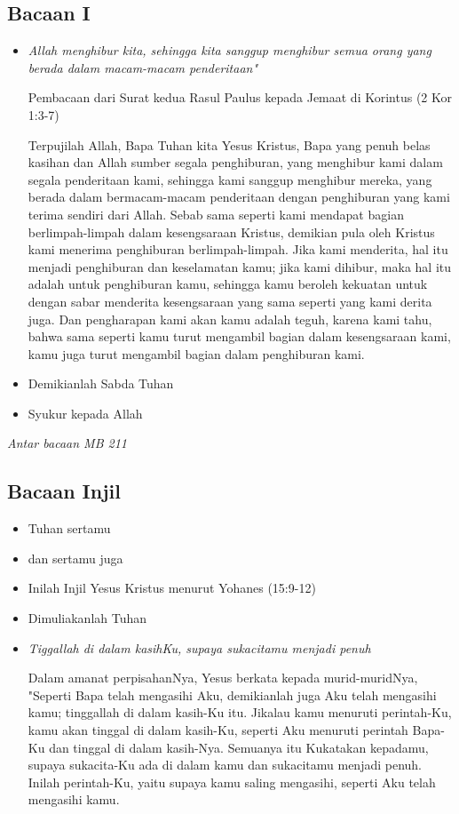 \documentclass[10pt,landscape]{article}
\makeatletter
\newcommand{\lagu}[1]{%
  {\parindent \z@ 
    \interlinepenalty\@M \slshape \mdseries \large \textit{#1}\par\nobreak \vskip 10\p@ }}
\newcommand{\BU}[1]{\begin{itemize} \item[U:] #1 \end{itemize}}
\newcommand{\BI}[1]{\begin{itemize} \item[I:] #1 \end{itemize}}
\newcommand{\BP}[1]{\begin{itemize} \item[P:] #1 \end{itemize}}
\makeatother
\begin{document}
\begin{multicols}{3}
\subsection*{Bacaan I}

\BP{\emph{Allah menghibur kita, sehingga kita sanggup menghibur semua orang yang berada dalam macam-macam penderitaan"}

Pembacaan dari Surat kedua Rasul Paulus kepada Jemaat di Korintus (2 Kor 1:3-7)

Terpujilah Allah, Bapa Tuhan kita Yesus Kristus, Bapa yang penuh belas kasihan dan Allah sumber segala penghiburan,
yang menghibur kami dalam segala penderitaan kami, sehingga kami sanggup menghibur mereka, yang berada dalam bermacam-macam penderitaan dengan penghiburan yang kami terima sendiri dari Allah.
Sebab sama seperti kami mendapat bagian berlimpah-limpah dalam kesengsaraan Kristus, demikian pula oleh Kristus kami menerima penghiburan berlimpah-limpah.
Jika kami menderita, hal itu menjadi penghiburan dan keselamatan kamu; jika kami dihibur, maka hal itu adalah untuk penghiburan kamu, sehingga kamu beroleh kekuatan untuk dengan sabar menderita kesengsaraan yang sama seperti yang kami derita juga.
Dan pengharapan kami akan kamu adalah teguh, karena kami tahu, bahwa sama seperti kamu turut mengambil bagian dalam kesengsaraan kami, kamu juga turut mengambil bagian dalam penghiburan kami.}

\BP{Demikianlah Sabda Tuhan}

\BU{Syukur kepada Allah}

\lagu{Antar bacaan MB 211}

\subsection*{Bacaan Injil}

\BI{Tuhan sertamu}
\BU{dan sertamu juga}
\BI{Inilah Injil Yesus Kristus menurut Yohanes (15:9-12)}
\BU{Dimuliakanlah Tuhan}

\BI{\emph{Tiggallah di dalam kasihKu, supaya sukacitamu menjadi penuh}

Dalam amanat perpisahanNya, Yesus berkata kepada murid-muridNya,
"Seperti Bapa telah mengasihi Aku, demikianlah juga Aku telah mengasihi kamu; tinggallah di dalam kasih-Ku itu.
Jikalau kamu menuruti perintah-Ku, kamu akan tinggal di dalam kasih-Ku, seperti Aku menuruti perintah Bapa-Ku dan tinggal di dalam kasih-Nya.
Semuanya itu Kukatakan kepadamu, supaya sukacita-Ku ada di dalam kamu dan sukacitamu menjadi penuh.
Inilah perintah-Ku, yaitu supaya kamu saling mengasihi, seperti Aku telah mengasihi kamu.}


\end{multicols}
\end{document}
